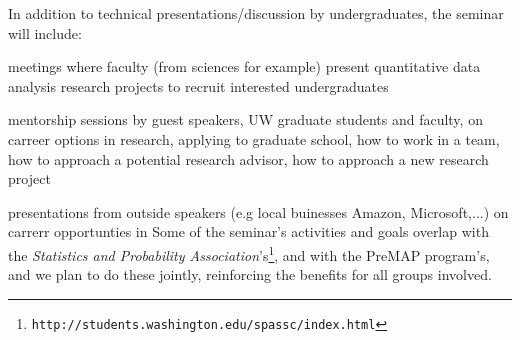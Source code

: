 In addition to technical presentations/discussion by undergraduates,
the seminar will include:
\bits
\item meetings where faculty (from sciences for example) present quantitative data analysis research projects to recruit interested undergraduates
\item  mentorship sessions by guest speakers, UW graduate students and faculty, on carreer options in research, applying to graduate school, how to work in a team, how to approach a potential research advisor, how to approach a new research project
\item presentations from outside speakers (e.g local buinesses Amazon,
  Microsoft,...) on carrerr opportunties in \cdse
\eits
Some of the seminar's activities and goals overlap with the {\em Statistics and Probability Association}'s\footnote{{\tt http://students.washington.edu/spassc/index.html}}, and with the PreMAP program's, and we plan to do these jointly, reinforcing the  benefits for all groups involved.


